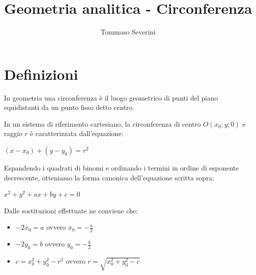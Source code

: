 \documentclass[10pt,a4paper]{article}
\author{Tommaso Severini}
\title{Geometria analitica - Circonferenza}
\begin{document}
	\maketitle
	
	
	\section{Definizioni}
	
	In geometria una circonferenza è il luogo geometrico di punti del piano equidistanti da un punto fisso detto centro.
\begin{center}	
\end{center}	
	
	
	In un sistema di riferimento cartesiano, la circonferenza di centro $O(x_0;y;0)$ e raggio $r$ è caratterizzata dall'equazione:
	\begin{definition}
	\centering	$(x-x_0) + (y-y_0) = r^2 $
	\end{definition}
	
	Espandendo i quadrati di binomi e ordinando i termini in ordine di esponente decrescente, otteniamo la forma canonica dell'equazione scritta sopra:
	
	\begin{definition}
		\centering	$x^2 + y^2 + ax + by + c = 0$
		
		Dalle sostituzioni effettuate ne conviene che:
		\begin{itemize}
			\item $-2x_0 = a$ ovvero $ x_0 = -\frac{a}{2}$
			\item $-2y_0 = b$ ovvero $ y_0 = -\frac{b}{2}$
			\item $c = x_0^2 + y_0^2 -r^2$ ovvero $ r = \sqrt{x_0^2 + y_0^2 -c}$
		\end{itemize}
	\end{definition}
\end{document}
